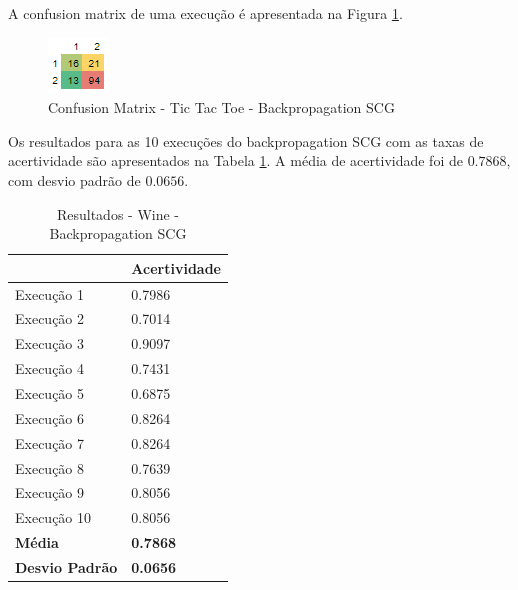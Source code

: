 A confusion matrix de uma execução é apresentada na Figura \ref{figura-confusion-matrix-tic-tac-toe-backpropagation-scg}.

\begin{figure}[h!]
  \centering
  \includegraphics[width=0.3\linewidth]{figs/confusion-matrix-tic-tac-toe-backpropagation-scg.png}
  \caption{Confusion Matrix - Tic Tac Toe - Backpropagation SCG}
  \label{figura-confusion-matrix-tic-tac-toe-backpropagation-scg}
\end{figure}

Os resultados para as 10 execuções do backpropagation SCG com as taxas de acertividade são apresentados na Tabela \ref{tabela-resultado-wine-scg}. A média de acertividade foi de $0.7868$, com desvio padrão de $0.0656$.

\begin{table}[h!]
\centering
\caption{Resultados - Wine - Backpropagation SCG}
\label{tabela-resultado-wine-scg}
\begin{tabular}{ll}
\toprule
                       & \textbf{Acertividade}       \\ \midrule
Execução 1             & 0.7986          \\
Execução 2             & 0.7014          \\
Execução 3             & 0.9097           \\
Execução 4             & 0.7431          \\
Execução 5             & 0.6875           \\
Execução 6             & 0.8264          \\
Execução 7             & 0.8264           \\
Execução 8             & 0.7639           \\
Execução 9             & 0.8056          \\
Execução 10            & 0.8056          \\ \bottomrule
\textbf{Média}         & \textbf{0.7868} \\
\textbf{Desvio Padrão} & \textbf{0.0656}
\end{tabular}
\end{table}

%
